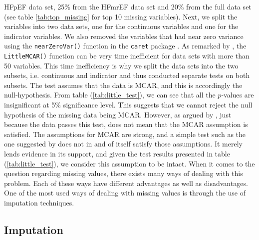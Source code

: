 \documentclass[../thesis.tex]{subfiles}
\begin{document}
 

\noindent HFpEF data set, 25\% from the HFmrEF data set and 20\% from the full data set (see table \ref{tab:top_missing} for top 10 missing variables). Next, we split the variables into two data sets, one for the continuous variables and one for the indicator variables. We also removed the variables that had near zero variance using the \texttt{nearZeroVar()} function in the \texttt{caret} package \citep{kuhncaret}. As remarked by \cite{BaylorEdPsych}, the \texttt{LittleMCAR()} function can be very time inefficient for data sets with more than 50 variables. This time inefficiency is why we split the data sets into the two subsets, i.e. continuous and indicator and thus conducted separate tests on both subsets. The test assumes that the data is MCAR, and this is accordingly the null-hypothesis. From table (\ref{tab:little_test}), we can see that all the $p$-values are insignificant at 5\% significance level. This suggests that we cannot reject the null hypothesis of the missing data  
\noindent being MCAR. However, as argued by \cite{allison1999missing}, just because the data passes this test, does not mean that the MCAR assumption is satisfied. The assumptions for MCAR are strong, and a simple test such as the one suggested by \cite{little1988test} does not in and of itself satisfy those assumptions. It merely lends evidence in its support, and given the test results presented in table (\ref{tab:little_test}), we consider this assumption to be intact. When it comes to the question regarding missing values, there exists many ways of dealing with this problem. Each of these ways have different advantages as well as disadvantages. One of the most used ways of dealing with missing values is through the use of imputation techniques. 

\vspace*{-0,5cm}\subsection{Imputation}
\label{subsec:impu}
\end{document}
